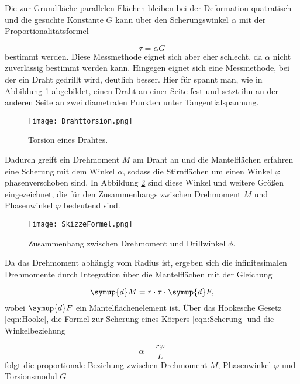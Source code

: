 Die zur Grundfläche parallelen Flächen bleiben bei der Deformation quatratisch
und die gesuchte Konstante $G$ kann über den Scherungswinkel $\alpha$ mit der
Proportionalitätsformel

\begin{equation}
  \tau = \alpha G
  \label{eqn:Scherung}
\end{equation}
bestimmt werden.
Diese Messmethode eignet sich aber eher schlecht, da $\alpha$ nicht zuverlässig
bestimmt werden kann.
Hingegen eignet sich eine Messmethode, bei der ein Draht gedrillt
wird, deutlich besser. Hier für spannt man, wie in Abbildung \ref{fig:Torsion}
abgebildet, einen Draht an einer Seite fest und setzt ihn an der anderen Seite
an zwei diametralen Punkten unter Tangentialspannung.

\begin{figure}
  \centering
  \texttt{[image: Drahttorsion.png]}
  \caption{Torsion eines Drahtes.}
  \label{fig:Torsion}
\end{figure}

Dadurch greift ein Drehmoment $M$ am Draht an und die
Mantelflächen erfahren eine Scherung mit dem Winkel $\alpha$, sodass die
Stirnflächen um einen Winkel $\varphi$ phasenverschoben sind.
In Abbildung \ref{fig:TorsionMantel} sind diese Winkel und weitere Größen
eingezeichnet, die für den Zusammenhangs zwischen Drehmoment $M$
und Phasenwinkel $\varphi$ bedeutend sind.

\newpage

\begin{figure}
  \centering
  \texttt{[image: SkizzeFormel.png]}
  \caption{Zusammenhang zwischen Drehmoment und Drillwinkel $\phi$.}
  \label{fig:TorsionMantel}
\end{figure}

Da das Drehmoment abhängig vom Radius ist, ergeben sich die infinitesimalen
Drehmomente durch Integration über die Mantelflächen mit der Gleichung

\begin{equation}
  \symup{d}M = r \cdot \tau \cdot \symup{d} F,
\end{equation}
wobei $\symup{d}F$ ein Mantelflächenelement ist.
Über das Hookesche Gesetz \eqref{eqn:Hooke}, die Formel zur Scherung eines
Körpers \eqref{eqn:Scherung} und die Winkelbeziehung

\begin{equation}
  \alpha = \frac{r\varphi}{L}
\end{equation}
folgt die proportionale Beziehung zwischen Drehmoment $M$, Phasenwinkel
$\varphi$ und Torsionsmodul $G$

